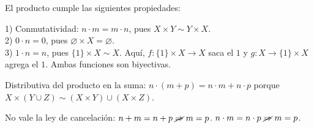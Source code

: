 El producto cumple las siguientes propiedades:

\begin{prop}
    1) Conmutatividad: $n \cdot m = m \cdot n$, pues $X \times Y \sim Y \times X$. \\
    2) $0 \cdot n = 0$, pues $\varnothing \times X = \varnothing$. \\
    3) $1 \cdot n = n$, pues $\{ 1 \} \times X \sim X$. Aquí, $f: \{ 1 \} \times X \to X$ saca el $1$ y $g: X \to \{ 1 \} \times X$ agrega el $1$. Ambas funciones son biyectivas.
\end{prop}

\begin{prop}
    Distributiva del producto en la suma: $n \cdot (m+p) = n \cdot m + n \cdot p$ porque $X \times (Y \cup Z) \sim (X \times Y) \cup (X \times Z)$.
\end{prop}

\begin{note}
    No vale la ley de cancelación: $n+m=n+p \;\cancel{\Rightarrow}\; m=p$.
    $n \cdot m = n \cdot p \;\cancel{\Rightarrow}\; m=p$.
\end{note}

